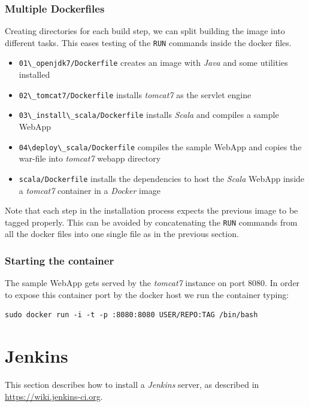 \documentclass[captions=tableheading]{article}
\begin{document}
\subsubsection{Multiple  Dockerfiles }
\label{sec-4-5-2}

Creating directories for each build step, we can split building the image into different tasks. This eases testing of the \texttt{RUN} commands inside the docker files. 
\begin{itemize}
\item \texttt{01\textbackslash{}\_openjdk7/Dockerfile} creates an image with \emph{Java} and some utilities installed
\item \texttt{02\textbackslash{}\_tomcat7/Dockerfile} installs \emph{tomcat7} as the servlet engine
\item \texttt{03\textbackslash{}\_install\textbackslash{}\_scala/Dockerfile} installs \emph{Scala} and compiles a sample WebApp
\item \texttt{04\textbackslash{}deploy\textbackslash{}\_scala/Dockerfile}  compiles the sample WebApp and copies the war-file into \emph{tomcat7} webapp directory
\item \texttt{scala/Dockerfile} installs the dependencies to host the \emph{Scala} WebApp inside a \emph{tomcat7} container in a \emph{Docker} image
\end{itemize}

Note that each step in the installation process expects the previous image to be tagged properly. This can be avoided by concatenating the \texttt{RUN} commands from all the docker files into one single file as in the previous section.
\subsubsection{Starting the container}
\label{sec-4-5-3}

The sample WebApp gets served by the \emph{tomcat7} instance on port 8080. In order to expose this container port by the docker host we run the container  typing:

\begin{verbatim}
sudo docker run -i -t -p :8080:8080 USER/REPO:TAG /bin/bash
\end{verbatim}
\section{Jenkins}
\label{sec-5}

This section describes how to install a \emph{Jenkins} server, as described in \href{https://wiki.jenkins-ci.org/display/JENKINS/Installing%2BJenkins%2Bon%2BUbuntu}{https://wiki.jenkins-ci.org}. 
\end{document}

